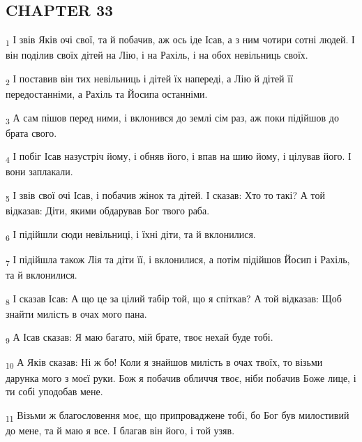 \subsection{CHAPTER 33}
\begin{tcolorbox}
\textsubscript{1} І звів Яків очі свої, та й побачив, аж ось іде Ісав, а з ним чотири сотні людей. І він поділив своїх дітей на Лію, і на Рахіль, і на обох невільниць своїх.
\end{tcolorbox}
\begin{tcolorbox}
\textsubscript{2} І поставив він тих невільниць і дітей їх напереді, а Лію й дітей її передостанніми, а Рахіль та Йосипа останніми.
\end{tcolorbox}
\begin{tcolorbox}
\textsubscript{3} А сам пішов перед ними, і вклонився до землі сім раз, аж поки підійшов до брата свого.
\end{tcolorbox}
\begin{tcolorbox}
\textsubscript{4} І побіг Ісав назустріч йому, і обняв його, і впав на шию йому, і цілував його. І вони заплакали.
\end{tcolorbox}
\begin{tcolorbox}
\textsubscript{5} І звів свої очі Ісав, і побачив жінок та дітей. І сказав: Хто то такі? А той відказав: Діти, якими обдарував Бог твого раба.
\end{tcolorbox}
\begin{tcolorbox}
\textsubscript{6} І підійшли сюди невільниці, і їхні діти, та й вклонилися.
\end{tcolorbox}
\begin{tcolorbox}
\textsubscript{7} І підійшла також Лія та діти її, і вклонилися, а потім підійшов Йосип і Рахіль, та й вклонилися.
\end{tcolorbox}
\begin{tcolorbox}
\textsubscript{8} І сказав Ісав: А що це за цілий табір той, що я спіткав? А той відказав: Щоб знайти милість в очах мого пана.
\end{tcolorbox}
\begin{tcolorbox}
\textsubscript{9} А Ісав сказав: Я маю багато, мій брате, твоє нехай буде тобі.
\end{tcolorbox}
\begin{tcolorbox}
\textsubscript{10} А Яків сказав: Ні ж бо! Коли я знайшов милість в очах твоїх, то візьми дарунка мого з моєї руки. Бож я побачив обличчя твоє, ніби побачив Боже лице, і ти собі уподобав мене.
\end{tcolorbox}
\begin{tcolorbox}
\textsubscript{11} Візьми ж благословення моє, що припроваджене тобі, бо Бог був милостивий до мене, та й маю я все. І благав він його, і той узяв.
\end{tcolorbox}
